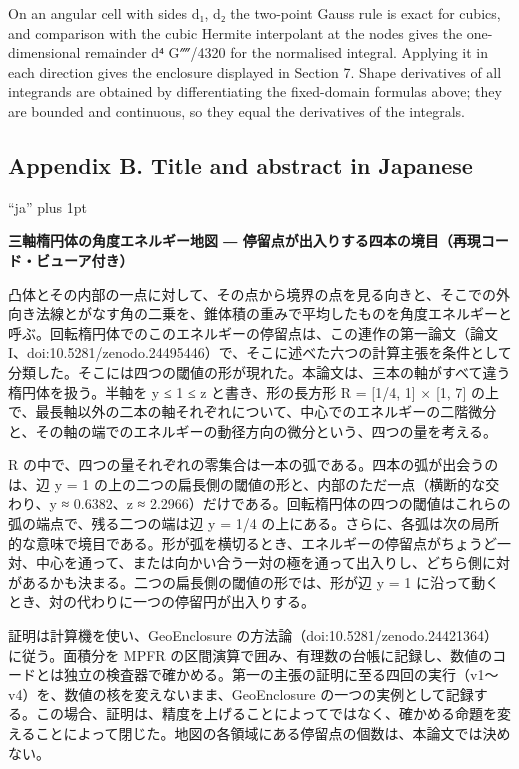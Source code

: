 \documentclass[
  11pt,
]{article}
\begin{document}
On an angular cell with sides d₁, d₂ the two-point Gauss rule is exact
for cubics, and comparison with the cubic Hermite interpolant at the
nodes gives the one-dimensional remainder d⁴ G⁗/4320 for the normalised
integral. Applying it in each direction gives the enclosure displayed in
Section 7. Shape derivatives of all integrands are obtained by
differentiating the fixed-domain formulas above; they are bounded and
continuous, so they equal the derivatives of the integrals.

\subsection{Appendix B. Title and abstract in Japanese}

\begingroup\jafont\XeTeXlinebreaklocale ``ja''\XeTeXlinebreakskip=0pt
plus 1pt

\textbf{三軸楕円体の角度エネルギー地図 ―
停留点が出入りする四本の境目（再現コード・ビューア付き）}

凸体とその内部の一点に対して、その点から境界の点を見る向きと、そこでの外向き法線とがなす角の二乗を、錐体積の重みで平均したものを角度エネルギーと呼ぶ。回転楕円体でのこのエネルギーの停留点は、この連作の第一論文（論文
I、doi:10.5281/zenodo.24495446）で、そこに述べた六つの計算主張を条件として分類した。そこには四つの閾値の形が現れた。本論文は、三本の軸がすべて違う楕円体を扱う。半軸を
y ≤ 1 ≤ z と書き、形の長方形 R = {[}1/4, 1{]} × {[}1, 7{]}
の上で、最長軸以外の二本の軸それぞれについて、中心でのエネルギーの二階微分と、その軸の端でのエネルギーの動径方向の微分という、四つの量を考える。

R
の中で、四つの量それぞれの零集合は一本の弧である。四本の弧が出会うのは、辺
y = 1 の上の二つの扁長側の閾値の形と、内部のただ一点（横断的な交わり、y
≈ 0.6382、z ≈
2.2966）だけである。回転楕円体の四つの閾値はこれらの弧の端点で、残る二つの端は辺
y = 1/4
の上にある。さらに、各弧は次の局所的な意味で境目である。形が弧を横切るとき、エネルギーの停留点がちょうど一対、中心を通って、または向かい合う一対の極を通って出入りし、どちら側に対があるかも決まる。二つの扁長側の閾値の形では、形が辺
y = 1 に沿って動くとき、対の代わりに一つの停留円が出入りする。

証明は計算機を使い、GeoEnclosure
の方法論（doi:10.5281/zenodo.24421364）に従う。面積分を MPFR
の区間演算で囲み、有理数の台帳に記録し、数値のコードとは独立の検査器で確かめる。第一の主張の証明に至る四回の実行（v1〜v4）を、数値の核を変えないまま、GeoEnclosure
の一つの実例として記録する。この場合、証明は、精度を上げることによってではなく、確かめる命題を変えることによって閉じた。地図の各領域にある停留点の個数は、本論文では決めない。

\endgroup
\end{document}
